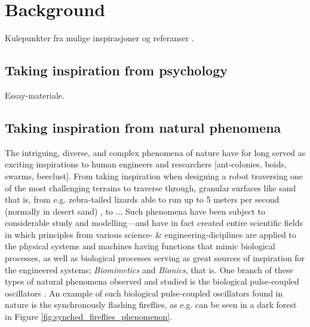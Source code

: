 \chapter{Background}
\label{chap:background}


Kulepunkter  fra mulige inspirasjoner og referanser .




\section{Taking inspiration from psychology}

Essay-materiale.





\section{Taking inspiration from natural phenomena}
The intriguing, diverse, and complex phenomena of nature have for long served as exciting inspirations to human engineers and researchers [ant-colonies, boids, swarms, beeclust]. From taking inspiration when designing a robot traversing one of the most challenging terrains to traverse through, granular surfaces like sand that is, from e.g. zebra-tailed lizards able to run up to 5 meters per second (normally in desert sand) \cite{sandbots}, to ... Such phenomena have been subject to considerable study and modelling—and have in fact created entire scientific fields \cite{biomimetics, bionics} in which principles from various science- \& engineering-diciplines are applied to the physical systems and machines having functions that mimic biological processes, as well as biological processes serving as great sources of inspiration for the engineered systems; \textit{Biomimetics} and \textit{Bionics}, that is. One branch of these types of natural phenomena observed and studied is the biological pulse-coupled oscillators \cite{russerMinimalAssumptionsReferanser}. An example of such biological pulse-coupled oscillators found in nature is the synchronously flashing fireflies, as e.g. can be seen in a dark forest in Figure \ref{fig:synched_fireflies_phenomenon}.

